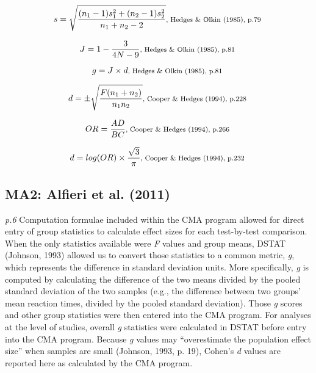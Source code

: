 \documentclass{article}
\begin{document}
\begin{equation*}
s={\sqrt {\frac {(n_{1}-1)s_{1}^{2}+(n_{2}-1)s_{2}^{2}}{n_{1}+n_{2}-2}}} \mbox{\footnotesize, Hedges \& Olkin (1985), p.79 } 
\end{equation*}

\begin{equation*}
J={1-{\frac {3}{4N-9}}} \mbox{\footnotesize, Hedges \& Olkin (1985), p.81 }
\end{equation*} 

\begin{equation*}
g=J \times d \mbox{\footnotesize, Hedges \& Olkin (1985), p.81 } 
\end{equation*}

\begin{equation*}
d=\pm{\sqrt {\frac {F(n_{1}+n_{2})}{n_{1}n_{2}}}} \mbox{\footnotesize, Cooper \& Hedges (1994), p.228 }
\end{equation*}

\begin{equation*}
OR={\frac {AD}{BC}} \mbox{\footnotesize, Cooper \& Hedges (1994), p.266 }
\end{equation*}

\begin{equation*}
d=log(OR) \times {\frac {\sqrt{3}}{\pi}} \mbox{\footnotesize, Cooper \& Hedges (1994), p.232 }
\end{equation*}

\subsection*{MA2: Alfieri et al. (2011)}
\textit{p.6} Computation formulae included within the CMA program allowed for direct entry of group statistics to calculate effect sizes for each test-by-test comparison. When the only statistics available were \textit{F} values and group means, DSTAT (Johnson, 1993) allowed us to convert those statistics to a common metric, \textit{g}, which represents the difference in standard deviation units. More specifically, \textit{g} is computed by calculating the difference of the two means divided by the pooled standard deviation of the two samples (e.g., the difference between two groups’ mean reaction times, divided by the pooled standard deviation). Those \textit{g} scores and other group statistics were then entered into the CMA program. For analyses at the level of studies, overall \textit{g} statistics were calculated in DSTAT before entry into the CMA program. Because \textit{g} values may “overestimate the population effect size” when samples are small (Johnson, 1993, p. 19), Cohen’s \textit{d} values are reported here as calculated by the CMA program. 
\end{document}
